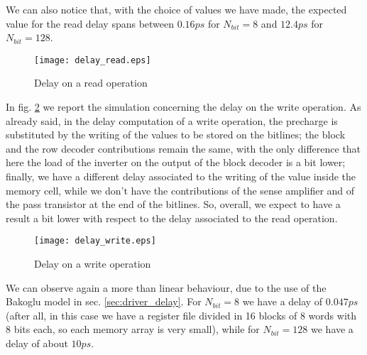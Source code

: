We can also notice that, with the choice of values we have made, the expected value for the read delay spans between $0.16ps$ for $N_{bit}=8$ and $12.4ps$ for $N_{bit}=128$. 

\begin{figure}[H]
	\begin{center}
		\texttt{[image: delay\_read.eps]}
	\end{center}
	\caption{Delay on a read operation} 
	\label{delay_read}
\end{figure}

In fig. \ref{delay_write} we report the simulation concerning the delay on the write operation. As already said, in the delay computation of a write operation, the precharge is substituted by the writing of the values to be stored on the bitlines; the block and the row decoder contributions remain the same, with the only difference that here the load of the inverter on the output of the block decoder is a bit lower; finally, we have a different delay associated to the writing of the value inside the memory cell, while we don't have the contributions of the sense amplifier and of the pass transistor at the end of the bitlines. So, overall, we expect to have a result a bit lower with respect to the delay associated to the read operation.
 
\begin{figure}[H]
	\begin{center}
		\texttt{[image: delay\_write.eps]}
	\end{center}
	\caption{Delay on a write operation}
	\label{delay_write}
\end{figure}
	
We can observe again a more than linear behaviour, due to the use of the Bakoglu model in sec. \ref{sec:driver_delay}. For $N_{bit}=8$ we have a delay of $0.047ps$ (after all, in this case we have a register file divided in 16 blocks of 8 words with 8 bits each, so each memory array is very small), while for $N_{bit}=128$ we have a delay of about $10ps$.